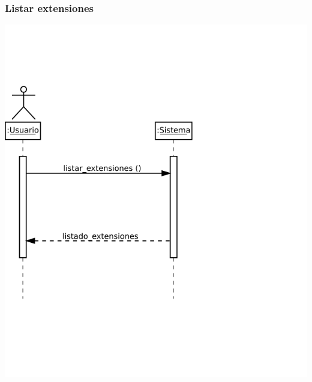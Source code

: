 \subsubsection{Listar extensiones}
\begin{center}
\includegraphics[scale=0.4]{listar_extensiones.png} \\
\end{center}

